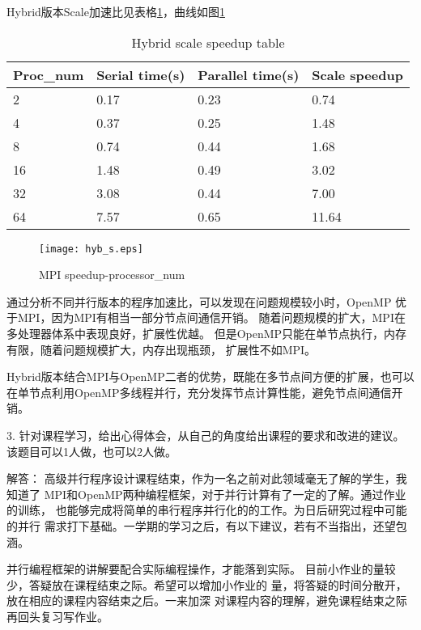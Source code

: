 \documentclass{ctexart}
\begin{document}
Hybrid版本Scale加速比见表格\ref{tab:hyb_s}，曲线如图\ref{fig:hyb_s}
\begin{table}[]
    \centering
    \caption{Hybrid scale speedup table} 
    \label{tab:hyb_s} 
    \begin{tabular}{@{}llll@{}}
        \toprule
        Proc\_num & Serial time(s) & Parallel time(s) & Scale speedup \\ \midrule
        2         & 0.17           & 0.23             & 0.74          \\
        4         & 0.37           & 0.25             & 1.48          \\
        8         & 0.74           & 0.44             & 1.68          \\
        16        & 1.48           & 0.49             & 3.02          \\
        32        & 3.08           & 0.44             & 7.00          \\
        64        & 7.57           & 0.65             & 11.64         \\ \bottomrule
    \end{tabular}
\end{table}
\begin{figure}
    \centering 
    \texttt{[image: hyb\_s.eps]} 
    \caption{MPI speedup-processor\_num} 
    \label{fig:hyb_s} 
\end{figure}


通过分析不同并行版本的程序加速比，可以发现在问题规模较小时，OpenMP
优于MPI，因为MPI有相当一部分节点间通信开销。
随着问题规模的扩大，MPI在多处理器体系中表现良好，扩展性优越。
但是OpenMP只能在单节点执行，内存有限，随着问题规模扩大，内存出现瓶颈，
扩展性不如MPI。

Hybrid版本结合MPI与OpenMP二者的优势，既能在多节点间方便的扩展，也可以
在单节点利用OpenMP多线程并行，充分发挥节点计算性能，避免节点间通信开销。


3. 针对课程学习，给出心得体会，从自己的角度给出课程的要求和改进的建议。
该题目可以1人做，也可以2人做。

{\heiti 解答：}
高级并行程序设计课程结束，作为一名之前对此领域毫无了解的学生，我知道了
MPI和OpenMP两种编程框架，对于并行计算有了一定的了解。通过作业的训练，
也能够完成将简单的串行程序并行化的的工作。为日后研究过程中可能的并行
需求打下基础。一学期的学习之后，有以下建议，若有不当指出，还望包涵。

并行编程框架的讲解要配合实际编程操作，才能落到实际。
目前小作业的量较少，答疑放在课程结束之际。希望可以增加小作业的
量，将答疑的时间分散开，放在相应的课程内容结束之后。一来加深
对课程内容的理解，避免课程结束之际再回头复习写作业。
\end{document}
